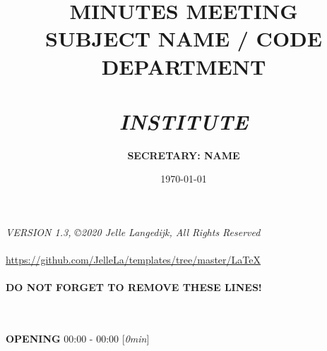 \documentclass[a4paper,10pt]{article}
\title{           \textbf{MINUTES MEETING} \\
                    \large{SUBJECT NAME / CODE} \\
                    \large{DEPARTMENT} \\
                    \hfill \\
                    \textit{INSTITUTE}
}
\author{\textbf{SECRETARY: NAME} }
\date{\today}
\begin{document}
\begin{center}
\textit{VERSION 1.3, ©2020 Jelle Langedijk, All Rights Reserved } \\
\hfill \\
\url{https://github.com/JelleLa/templates/tree/master/LaTeX}\\
\hfill \\
\textbf{DO NOT FORGET TO REMOVE THESE LINES!}\\
\end{center}

\newpage


\maketitle

\hfill \\
\hfill \\

\textbf{OPENING} \hfill 00:00 - 00:00 [\textit{0min}]
\end{document}
